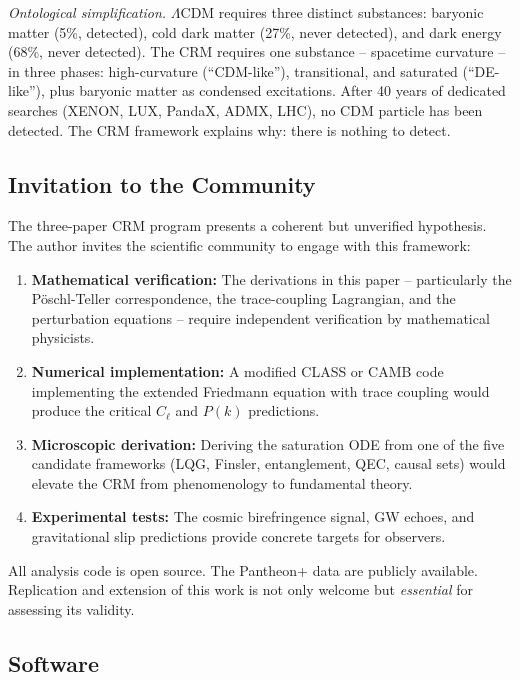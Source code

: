 \documentclass[aps,prd,twocolumn,superscriptaddress,nofootinbib]{revtex4-2}
\begin{document}
\textit{Ontological simplification.} $\Lambda$CDM requires three distinct substances: baryonic matter (5\%, detected), cold dark matter (27\%, never detected), and dark energy (68\%, never detected). The CRM requires one substance -- spacetime curvature -- in three phases: high-curvature (``CDM-like''), transitional, and saturated (``DE-like''), plus baryonic matter as condensed excitations. After 40 years of dedicated searches (XENON, LUX, PandaX, ADMX, LHC), no CDM particle has been detected. The CRM framework explains why: there is nothing to detect.

\subsection{Invitation to the Community}

The three-paper CRM program presents a coherent but unverified hypothesis. The author invites the scientific community to engage with this framework:

\begin{enumerate}
\item \textbf{Mathematical verification:} The derivations in this paper -- particularly the P\"oschl-Teller correspondence, the trace-coupling Lagrangian, and the perturbation equations -- require independent verification by mathematical physicists.
\item \textbf{Numerical implementation:} A modified CLASS or CAMB code implementing the extended Friedmann equation with trace coupling would produce the critical $C_\ell$ and $P(k)$ predictions.
\item \textbf{Microscopic derivation:} Deriving the saturation ODE from one of the five candidate frameworks (LQG, Finsler, entanglement, QEC, causal sets) would elevate the CRM from phenomenology to fundamental theory.
\item \textbf{Experimental tests:} The cosmic birefringence signal, GW echoes, and gravitational slip predictions provide concrete targets for observers.
\end{enumerate}

\noindent All analysis code is open source. The Pantheon+ data are publicly available. Replication and extension of this work is not only welcome but \textit{essential} for assessing its validity.


\subsection*{Software}
\end{document}
